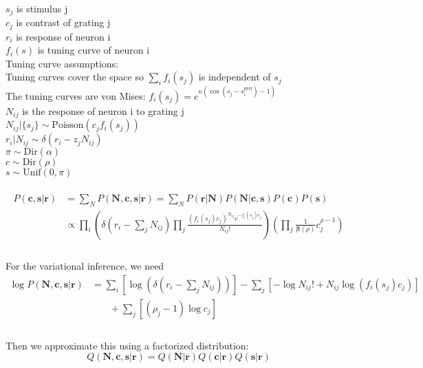 \documentclass[12pt]{article}
\begin{document}
 \\
$s_j$ is stimulus j\\
$c_j$ is contrast of grating j\\
$r_i$ is response of neuron i\\
$f_i(s)$ is tuning curve of neuron i\\
Tuning curve assumptions:\\
Tuning curves cover the space so $\sum_i f_i(s_j)$ is independent of $s_j$\\
The tuning curves are von Mises: $f_i(s_j) = e^{\kappa(\cos(s_j - s_i^{\text{pref}}) - 1)}$\\
$N_{ij}$ is the response of neuron i to grating j\\
$N_{ij}|\{s_j\}  \sim \text{Poisson}(c_j f_i(s_j))$\\
$r_i|N_{ij} \sim \delta(r_i - z_j N_{ij})$\\
$\pi \sim \text{Dir} (\alpha)$\\
$c \sim \text{Dir} (\rho)$\\
$s \sim \text{Unif} (0, \pi)$\\
\\
\begin{equation}
\begin{aligned}
P(\mathbf{c, s|r}) & = \sum_N P(\mathbf{N, c, s|r}) = \sum_N P(\mathbf{r|N}) P(\mathbf{N|c, s}) P(\mathbf{c}) P(\mathbf{s})\\
&\propto \prod_i (\delta(r_i - \sum_j N_{ij}) \prod_j\frac{(f_i(s_j)c_j)^{N_{ij}} e^{-f_i(s_j) c_j}}{N_{ij}!}) (\prod_j \frac{1}{\mathbf{\beta}(\rho)} c_j^{\rho - 1})\\
\end{aligned}
\end{equation}
\\
For the variational inference, we need\\
 \begin{equation}
\begin{aligned}
\log P(\mathbf{N, c, s| r}) &= \sum_i [\log(\delta(r_i - \sum_j N_{ij}))] - \sum_j [-\log N_{ij}! + N_{ij} \log(f_i(s_j)c_j)]\\
& \phantom{{}=1} + \sum_j [(\rho_j - 1)\log c_j]\\
\end{aligned}
\end{equation}
\\
Then we approximate this using a factorized distribution:\\
\begin{equation}
Q(\mathbf{N, c, s|r}) = Q(\mathbf{N|r}) Q(\mathbf{c|r}) Q(\mathbf{s|r})
\end{equation}
\end{document}
